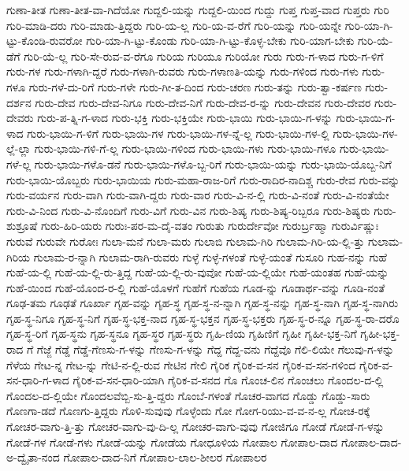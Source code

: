 {ಗುಣಾ-ತೀತ
ಗುಣಾ-ತೀತ-ವಾ-ಗಿದೆಯೋ
ಗುದ್ದಲಿ-ಯನ್ನು
ಗುದ್ದಲಿ-ಯಿಂದ
ಗುದ್ದು
ಗುಪ್ತ
ಗುಪ್ತ-ವಾದ
ಗುಪ್ತರು
ಗುರಿ
ಗುರಿ-ಮಾಡಿ-ದರು
ಗುರಿ-ಮಾಡು-ತ್ತಿದ್ದರು
ಗುರಿ-ಯ-ಲ್ಲ
ಗುರಿ-ಯ-ವ-ರೆಗೆ
ಗುರಿ-ಯನ್ನು
ಗುರಿ-ಯನ್ನೇ
ಗುರಿ-ಯಾ-ಗಿ-ಟ್ಟು-ಕೊಂಡಿ-ರುವರೋ
ಗುರಿ-ಯಾ-ಗಿ-ಟ್ಟು-ಕೊಂಡು
ಗುರಿ-ಯಾ-ಗಿ-ಟ್ಟು-ಕೊಳ್ಳ-ಬೇಕು
ಗುರಿ-ಯಾಗ-ಬೇಕು
ಗುರಿ-ಯೆ-ಡೆಗೆ
ಗುರಿ-ಯೆ-ಲ್ಲ
ಗುರಿ-ಸೇ-ರುವ-ವ-ರೆಗೂ
ಗುರಿಯ
ಗುರಿಯೂ
ಗುರಿಯೋ
ಗುರು
ಗುರು-ಗ-ಳಾದ
ಗುರು-ಗ-ಳಿಗೆ
ಗುರು-ಗಳ
ಗುರು-ಗಳಾಗಿ-ದ್ದರೆ
ಗುರು-ಗಳಾಗಿ-ರುವರು
ಗುರು-ಗಳಾಣತಿ-ಯನ್ನು
ಗುರು-ಗಳಿಂದ
ಗುರು-ಗಳು
ಗುರು-ಗಳೂ
ಗುರು-ಗಳೆ-ದು-ರಿಗೆ
ಗುರು-ಗಳೇ
ಗುರು-ಗೀ-ತ-ದಿಂದ
ಗುರು-ಚರಣ
ಗುರು-ತನ್ನು
ಗುರು-ತ್ವಾ-ಕರ್ಷಣ
ಗುರು-ದರ್ಶನ
ಗುರು-ದೇವ
ಗುರು-ದೇವ-ನಿಗೂ
ಗುರು-ದೇವ-ನಿಗೆ
ಗುರು-ದೇವ-ರ-ನ್ನು
ಗುರು-ದೇವನ
ಗುರು-ದೇವರ
ಗುರು-ದೇವರು
ಗುರು-ಪ-ತ್ನಿ-ಗ-ಳಾದ
ಗುರು-ಭಕ್ತಿ
ಗುರು-ಭಕ್ತಿಯೇ
ಗುರು-ಭಾಯಿ
ಗುರು-ಭಾಯಿ-ಗ-ಳನ್ನು
ಗುರು-ಭಾಯಿ-ಗ-ಳಾದ
ಗುರು-ಭಾಯಿ-ಗ-ಳಿಗೆ
ಗುರು-ಭಾಯಿ-ಗಳ
ಗುರು-ಭಾಯಿ-ಗಳ-ನ್ನೆ-ಲ್ಲ
ಗುರು-ಭಾಯಿ-ಗಳ-ಲ್ಲಿ
ಗುರು-ಭಾಯಿ-ಗಳ-ಲ್ಲೆ-ಲ್ಲಾ
ಗುರು-ಭಾಯಿ-ಗಳಿ-ಗೆ-ಲ್ಲ
ಗುರು-ಭಾಯಿ-ಗಳಿಂದ
ಗುರು-ಭಾಯಿ-ಗಳು
ಗುರು-ಭಾಯಿ-ಗಳೂ
ಗುರು-ಭಾಯಿ-ಗಳೆ-ಲ್ಲ
ಗುರು-ಭಾಯಿ-ಗಳೊ-ಡನೆ
ಗುರು-ಭಾಯಿ-ಗಳೊ-ಬ್ಬ-ರಿಗೆ
ಗುರು-ಭಾಯಿ-ಯನ್ನು
ಗುರು-ಭಾಯಿ-ಯೊಬ್ಬ-ನಿಗೆ
ಗುರು-ಭಾಯಿ-ಯೊಬ್ಬರು
ಗುರು-ಭಾಯಿಯ
ಗುರು-ಮಹಾ-ರಾಜ-ರಿಗೆ
ಗುರು-ರಾದಿರ-ನಾದಿಶ್ಚ
ಗುರು-ರೇವ
ಗುರು-ವನ್ನು
ಗುರು-ವರ್ಯನ
ಗುರು-ವಾಗಿ
ಗುರು-ವಾಗಿ-ದ್ದರು
ಗುರು-ವಾರ
ಗುರು-ವಿ-ನ-ಲ್ಲಿ
ಗುರು-ವಿ-ನಂತೆ
ಗುರು-ವಿ-ನಂತೆಯೇ
ಗುರು-ವಿ-ನಿಂದ
ಗುರು-ವಿ-ನೊಂದಿಗೆ
ಗುರು-ವಿಗೆ
ಗುರು-ವಿನ
ಗುರು-ಶಿಷ್ಯ
ಗುರು-ಶಿಷ್ಯ-ರಿಬ್ಬರೂ
ಗುರು-ಶಿಷ್ಯರು
ಗುರು-ಶುಶ್ರೂಷೆ
ಗುರು-ಹಿರಿ-ಯರು
ಗುರುಃ-ಪರ-ಮ-ದೈ-ವತಂ
ಗುರುತು
ಗುರುರ್ದೇವೋ
ಗುರುರ್ಬ್ರಹ್ಮಾ
ಗುರುರ್ವಿಷ್ಣುಃ
ಗುರುವೆ
ಗುರುವೇ
ಗುರೋಃ
ಗುಲಾ-ಮನೆ
ಗುಲಾ-ಮರು
ಗುಲಾಬಿ
ಗುಲಾಮ-ಗಿರಿ
ಗುಲಾಮ-ಗಿರಿ-ಯ-ಲ್ಲಿ-ತ್ತು
ಗುಲಾಮ-ಗಿರಿಯ
ಗುಲಾಮ-ರ-ನ್ನಾಗಿ
ಗುಲಾಮ-ರಾಗಿ-ರುವರು
ಗುಳ್ಳೆ
ಗುಳ್ಳೆ-ಗಳಂತೆ
ಗುಳ್ಳೆ-ಯಂತೆ
ಗುಸೂರಿ
ಗುಹ-ನನ್ನು
ಗುಹೆ
ಗುಹೆ-ಯ-ಲ್ಲಿ
ಗುಹೆ-ಯ-ಲ್ಲಿ-ರು-ತ್ತಿದ್ದ
ಗುಹೆ-ಯ-ಲ್ಲಿ-ರು-ವುವೋ
ಗುಹೆ-ಯ-ಲ್ಲಿಯೇ
ಗುಹೆ-ಯಂತಹ
ಗುಹೆ-ಯನ್ನು
ಗುಹೆ-ಯಿಂದ
ಗುಹೆ-ಯೊಂದ-ರ-ಲ್ಲಿ
ಗುಹೆ-ಯೊಳಗೆ
ಗುಹೆಗೆ
ಗುಹೆಯ
ಗೂಡ-ನ್ನು
ಗೂಡಾರ್ಥ-ವನ್ನು
ಗೂಡಿ-ನಂತೆ
ಗೂಢ-ತಮ
ಗೂಢತೆ
ಗೂರ್ಖಾ
ಗೃಹ-ವನ್ನು
ಗೃಹ-ಸ್ಥ
ಗೃಹ-ಸ್ಥ-ನ-ನ್ನಾಗಿ
ಗೃಹ-ಸ್ಥ-ನನ್ನು
ಗೃಹ-ಸ್ಥ-ನಾಗಿ
ಗೃಹ-ಸ್ಥ-ನಾಗಿರು
ಗೃಹ-ಸ್ಥ-ನಿಗೂ
ಗೃಹ-ಸ್ಥ-ನಿಗೆ
ಗೃಹ-ಸ್ಥ-ಭಕ್ತ-ನಾದ
ಗೃಹ-ಸ್ಥ-ಭಕ್ತನ
ಗೃಹ-ಸ್ಥ-ಭಕ್ತರು
ಗೃಹ-ಸ್ಥ-ರ-ನ್ನೂ
ಗೃಹ-ಸ್ಥ-ರಾ-ದರೊ
ಗೃಹ-ಸ್ಥ-ರಿಗೆ
ಗೃಹ-ಸ್ಥನು
ಗೃಹ-ಸ್ಥನೂ
ಗೃಹ-ಸ್ಥರ
ಗೃಹ-ಸ್ಥರು
ಗೃಹಿ-ಣಿಯ
ಗೃಹಿಣಿಗೆ
ಗೃಹೀ
ಗೃಹೀ-ಭಕ್ತ-ನಿಗೆ
ಗೃಹೀ-ಭಕ್ತ-ರಾದ
ಗೆ
ಗೆಜ್ಜೆ
ಗೆಡ್ಡೆ
ಗೆಡ್ಡೆ-ಗೆಣಸು-ಗ-ಳನ್ನು
ಗೆಣಸು-ಗ-ಳನ್ನು
ಗೆದ್ದ
ಗೆದ್ದ-ವನು
ಗೆದ್ದೆವೊ
ಗೆಲಿ-ಲಿಯೇ
ಗೆಲುವು-ಗ-ಳನ್ನು
ಗೆಳೆಯ
ಗೇಟ-ನ್ನ
ಗೇಟ-ನ್ನು
ಗೇಟಿ-ನ-ಲ್ಲಿ-ರುವ
ಗೇಟಿನ
ಗೇಲಿ
ಗೈರಿಕ
ಗೈರಿಕ-ವ-ಸನ
ಗೈರಿಕ-ವ-ಸನ-ಗಳಿಂದ
ಗೈರಿಕ-ವ-ಸನ-ಧಾರಿ-ಗ-ಳಾದ
ಗೈರಿಕ-ವ-ಸನ-ಧಾರಿ-ಯಾಗಿ
ಗೈರಿಕ-ವ-ಸನದ
ಗೊ
ಗೊಂಚ-ಲಿನ
ಗೊಂಚಲು
ಗೊಂದಲ-ದ-ಲ್ಲಿ
ಗೊಂದಲ-ದ-ಲ್ಲಿಯೇ
ಗೊಂದಲವೆಬ್ಬಿ-ಸು-ತ್ತಿ-ದ್ದರು
ಗೊಂಬೆ-ಗಳಂತೆ
ಗೊಚರ-ವಾಗದ
ಗೊಡ್ಡು
ಗೊಡ್ಡು-ಸಾರು
ಗೊಣಗಾ-ಡದೆ
ಗೊಣಗು-ತ್ತಿದ್ದರು
ಗೊಳಿ-ಸುವುವು
ಗೊಳ್ಳೆಂದು
ಗೋ
ಗೋಗ-ರಿಯು-ವ-ವ-ನ-ಲ್ಲ
ಗೋಚ-ರಕ್ಕೆ
ಗೋಚರ-ವಾಗು-ತ್ತಿ-ತ್ತು
ಗೋಚರ-ವಾಗು-ವು-ದಿ-ಲ್ಲ
ಗೋಚರ-ವಾಗು-ವುವು
ಗೋಜಿಗೂ
ಗೋಡೆ
ಗೋಡೆ-ಗ-ಳನ್ನು
ಗೋಡೆ-ಗಳ
ಗೋಡೆ-ಗಳು
ಗೋಡೆ-ಯನ್ನು
ಗೋಡೆಯ
ಗೋಧೂಳಿಯ
ಗೋಪಾಲ
ಗೋಪಾಲ-ದಾದ
ಗೋಪಾಲ-ದಾದ-ಅ-ದ್ವೈತಾ-ನಂದ
ಗೋಪಾಲ-ದಾದ-ನಿಗೆ
ಗೋಪಾಲ-ಲಾಲ-ಶೀಲರ
ಗೋಪಾಲರ
}
